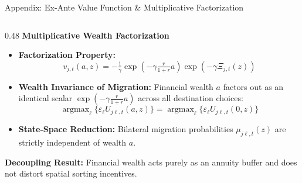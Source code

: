 \documentclass[aspectratio=169, 10pt]{beamer}
\begin{document}
\begin{frame}{Appendix: Ex-Ante Value Function \& Multiplicative Factorization \hfill \hyperlink{main:prop1}{\scriptsize{}}}
\begin{columns}[T]
        \begin{column}{0.48\textwidth}
            \textbf{\small Multiplicative Wealth Factorization}
            \vspace{0.04cm}
            \begin{itemize}\scriptsize\setlength{\itemsep}{2pt}
                \item \textbf{Factorization Property:}
                $$v_{j,t}(a, z) = -\tfrac{1}{\gamma} \exp\left(-\gamma \tfrac{r}{1+r} a\right) \exp\left(-\gamma \Xi_{j,t}(z)\right)$$
                \item \textbf{Wealth Invariance of Migration:}
                Financial wealth $a$ factors out as an identical scalar $\exp(-\gamma \frac{r}{1+r} a)$ across all destination choices:
                $$\operatorname{argmax}_\ell \{ \varepsilon_\ell U_{j\ell,t}(a,z) \} = \operatorname{argmax}_\ell \{ \varepsilon_\ell U_{j\ell,t}(0,z) \}$$
                \item \textbf{State-Space Reduction:}
                Bilateral migration probabilities $\mu_{j\ell,t}(z)$ are strictly independent of wealth $a$.
            \end{itemize}
            \vspace{0.02cm}
            \begin{tcolorbox}[takeawaybox]
                \tiny \textbf{Decoupling Result:} Financial wealth acts purely as an annuity buffer and does not distort spatial sorting incentives.
            \end{tcolorbox}
        \end{column}
    \end{columns}
\end{frame}

\end{document}
